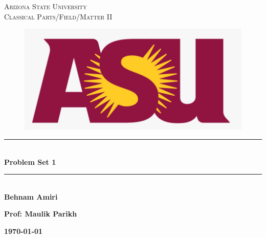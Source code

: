 \documentclass[fleqn]{article}
\begin{document}
  \begin{titlepage}

    \newcommand{\HRule}{\rule{\linewidth}{0.5mm}}

    \center


    \textsc{\LARGE Arizona State University}\\[1.5cm]

    \textsc{\LARGE Classical Parts/Field/Matter II}\\[1.5cm]


    \begin{figure}
      \includegraphics[width=\linewidth]{asu.png}
    \end{figure}


    \HRule \\[0.4cm]
    { \huge \bfseries Problem Set 1}\\[0.4cm] 
    \HRule \\[1.5cm]

    \textbf{Behnam Amiri}

    \bigbreak

    \textbf{Prof: Maulik Parikh}

    \bigbreak


    \textbf{{\large \today}\\[2cm]}

    \vfill

  \end{titlepage}
\end{document}
